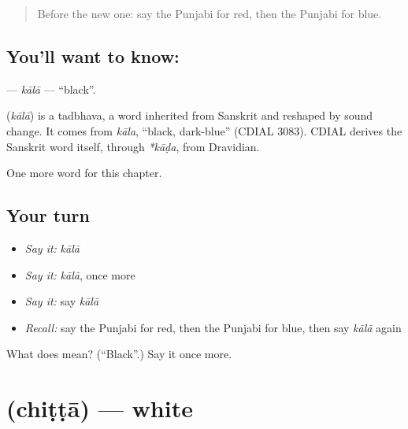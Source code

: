 \label{lesson:PA-C84-kala}



\begin{quote}
Before the new one: say the Punjabi for red, then the Punjabi for blue.
\end{quote}

\subsection*{You'll want to know: }
\textbf{} — \emph{kālā} — \textquotedblleft{}black\textquotedblright{}.

\begin{cousinweb}
\textbf{} (\emph{kālā}) is a tadbhava, a word inherited from Sanskrit and reshaped by sound change. It comes from \emph{kāla}, \textquotedblleft{}black, dark-blue\textquotedblright{} (CDIAL 3083). CDIAL derives the Sanskrit word itself, through \emph{*kāḍa}, from Dravidian.
\end{cousinweb}

\begin{grammarlens}[title={What you've built}]
One more word for this chapter.
\end{grammarlens}

\subsection*{Your turn}
\begin{itemize}
\raggedright
  \item \emph{Say it:} \emph{kālā}
  \item \emph{Say it:} \emph{kālā}, once more
  \item \emph{Say it:} say \emph{kālā}
  \item \emph{Recall:} say the Punjabi for red, then the Punjabi for blue, then say \emph{kālā} again
\end{itemize}

\begin{tcolorbox}[breakable,colback=teal!4,colframe=teal!35!black,title={Before you move on}]
What does  mean? (\textquotedblleft{}Black\textquotedblright{}.) Say it once more.
\end{tcolorbox}
\section[\texorpdfstring{\pa{ਚਿੱਟਾ} (chiṭṭā)}{ਚਿੱਟਾ (chiṭṭā)}]{ (chiṭṭā) — white}

